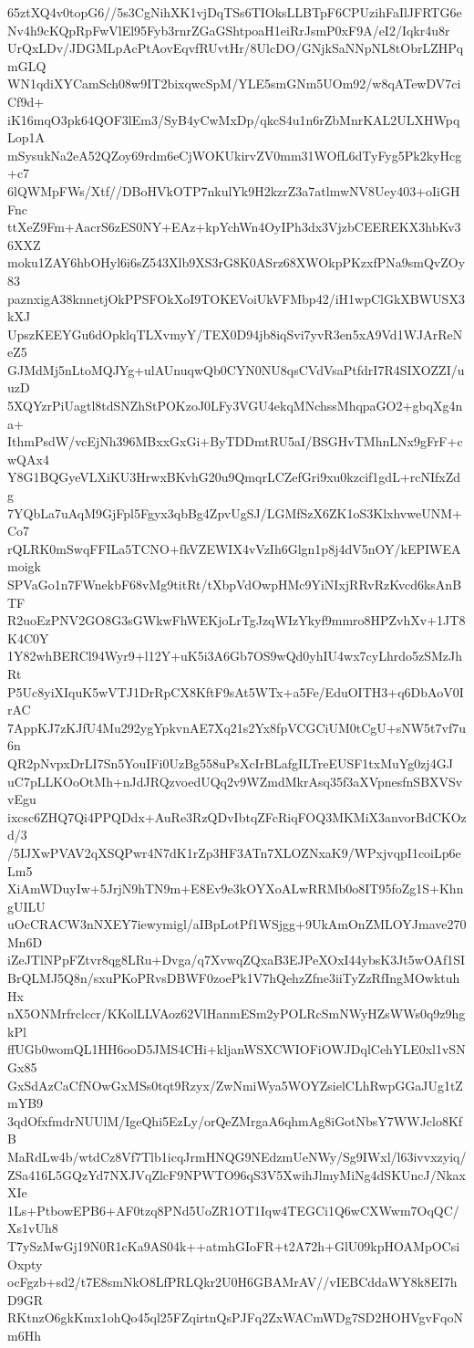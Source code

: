 65ztXQ4v0topG6//5s3CgNihXK1vjDqTSs6TIOksLLBTpF6CPUzihFaIlJFRTG6e
Nv4h9cKQpRpFwVlEl95Fyb3rnrZGaGShtpoaH1eiRrJsmP0xF9A/eI2/Iqkr4u8r
UrQxLDv/JDGMLpAcPtAovEqvfRUvtHr/8UlcDO/GNjkSaNNpNL8tObrLZHPqmGLQ
WN1qdiXYCamSch08w9IT2bixqwcSpM/YLE5smGNm5UOm92/w8qATewDV7ciCf9d+
iK16mqO3pk64QOF3lEm3/SyB4yCwMxDp/qkcS4u1n6rZbMnrKAL2ULXHWpqLop1A
mSysukNa2eA52QZoy69rdm6eCjWOKUkirvZV0mm31WOfL6dTyFyg5Pk2kyHcg+c7
6lQWMpFWs/Xtf//DBoHVkOTP7nkulYk9H2kzrZ3a7atlmwNV8Uey403+oIiGHFnc
ttXeZ9Fm+AacrS6zES0NY+EAz+kpYchWn4OyIPh3dx3VjzbCEEREKX3hbKv36XXZ
moku1ZAY6hbOHyl6i6sZ543Xlb9XS3rG8K0ASrz68XWOkpPKzxfPNa9smQvZOy83
paznxigA38knnetjOkPPSFOkXoI9TOKEVoiUkVFMbp42/iH1wpClGkXBWUSX3kXJ
UpszKEEYGu6dOpklqTLXvmyY/TEX0D94jb8iqSvi7yvR3en5xA9Vd1WJArReNeZ5
GJMdMj5nLtoMQJYg+ulAUnuqwQb0CYN0NU8qsCVdVsaPtfdrI7R4SIXOZZI/uuzD
5XQYzrPiUagtl8tdSNZhStPOKzoJ0LFy3VGU4ekqMNchssMhqpaGO2+gbqXg4na+
IthmPsdW/vcEjNh396MBxxGxGi+ByTDDmtRU5aI/BSGHvTMhnLNx9gFrF+cwQAx4
Y8G1BQGyeVLXiKU3HrwxBKvhG20u9QmqrLCZefGri9xu0kzcif1gdL+rcNIfxZdg
7YQbLa7uAqM9GjFpl5Fgyx3qbBg4ZpvUgSJ/LGMfSzX6ZK1oS3KlxhvweUNM+Co7
rQLRK0mSwqFFILa5TCNO+fkVZEWIX4vVzIh6Glgn1p8j4dV5nOY/kEPIWEAmoigk
SPVaGo1n7FWnekbF68vMg9titRt/tXbpVdOwpHMc9YiNIxjRRvRzKvcd6ksAnBTF
R2uoEzPNV2GO8G3sGWkwFhWEKjoLrTgJzqWIzYkyf9mmro8HPZvhXv+1JT8K4C0Y
1Y82whBERCl94Wyr9+l12Y+uK5i3A6Gb7OS9wQd0yhIU4wx7cyLhrdo5zSMzJhRt
P5Uc8yiXIquK5wVTJ1DrRpCX8KftF9sAt5WTx+a5Fe/EduOITH3+q6DbAoV0IrAC
7AppKJ7zKJfU4Mu292ygYpkvnAE7Xq21s2Yx8fpVCGCiUM0tCgU+sNW5t7vf7u6n
QR2pNvpxDrLI7Sn5YouIFi0UzBg558uPsXcIrBLafgILTreEUSF1txMuYg0zj4GJ
uC7pLLKOoOtMh+nJdJRQzvoedUQq2v9WZmdMkrAsq35f3aXVpnesfnSBXVSvvEgu
ixcsc6ZHQ7Qi4PPQDdx+AuRe3RzQDvIbtqZFcRiqFOQ3MKMiX3anvorBdCKOzd/3
/5IJXwPVAV2qXSQPwr4N7dK1rZp3HF3ATn7XLOZNxaK9/WPxjvqpI1coiLp6eLm5
XiAmWDuyIw+5JrjN9hTN9m+E8Ev9e3kOYXoALwRRMb0o8IT95foZg1S+KhngUILU
uOcCRACW3nNXEY7iewymigl/aIBpLotPf1WSjgg+9UkAmOnZMLOYJmave270Mn6D
iZeJTlNPpFZtvr8qg8LRu+Dvga/q7XvwqZQxaB3EJPeXOxI44ybsK3Jt5wOAf1SI
BrQLMJ5Q8n/sxuPKoPRvsDBWF0zoePk1V7hQehzZfne3iiTyZzRfIngMOwktuhHx
nX5ONMrfrclccr/KKolLLVAoz62VlHanmESm2yPOLRcSmNWyHZsWWs0q9z9hgkPl
ffUGb0womQL1HH6ooD5JMS4CHi+kljanWSXCWIOFiOWJDqlCehYLE0xl1vSNGx85
GxSdAzCaCfNOwGxMSs0tqt9Rzyx/ZwNmiWya5WOYZsielCLhRwpGGaJUg1tZmYB9
3qdOfxfmdrNUUlM/IgeQhi5EzLy/orQeZMrgaA6qhmAg8iGotNbsY7WWJclo8KfB
MaRdLw4b/wtdCz8Vf7Tlb1icqJrmHNQG9NEdzmUeNWy/Sg9IWxl/l63ivvxzyiq/
ZSa416L5GQzYd7NXJVqZlcF9NPWTO96qS3V5XwihJlmyMiNg4dSKUncJ/NkaxXIe
1Ls+PtbowEPB6+AF0tzq8PNd5UoZR1OT1Iqw4TEGCi1Q6wCXWwm7OqQC/Xs1vUh8
T7ySzMwGj19N0R1cKa9AS04k++atmhGIoFR+t2A72h+GlU09kpHOAMpOCsiOxpty
ocFgzb+sd2/t7E8smNkO8LfPRLQkr2U0H6GBAMrAV//vIEBCddaWY8k8EI7hD9GR
RKtnzO6gkKmx1ohQo45ql25FZqirtnQsPJFq2ZxWACmWDg7SD2HOHVgvFqoNm6Hh
